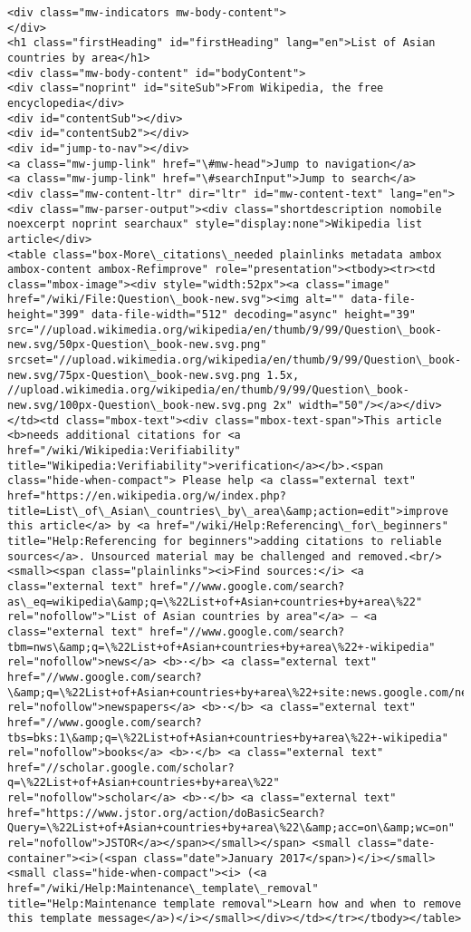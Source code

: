 \documentclass[11pt]{article}
\begin{document}
\begin{Verbatim}[commandchars=\\\{\}]
<div class="mw-indicators mw-body-content">
</div>
<h1 class="firstHeading" id="firstHeading" lang="en">List of Asian countries by area</h1>
<div class="mw-body-content" id="bodyContent">
<div class="noprint" id="siteSub">From Wikipedia, the free encyclopedia</div>
<div id="contentSub"></div>
<div id="contentSub2"></div>
<div id="jump-to-nav"></div>
<a class="mw-jump-link" href="\#mw-head">Jump to navigation</a>
<a class="mw-jump-link" href="\#searchInput">Jump to search</a>
<div class="mw-content-ltr" dir="ltr" id="mw-content-text" lang="en"><div class="mw-parser-output"><div class="shortdescription nomobile noexcerpt noprint searchaux" style="display:none">Wikipedia list article</div>
<table class="box-More\_citations\_needed plainlinks metadata ambox ambox-content ambox-Refimprove" role="presentation"><tbody><tr><td class="mbox-image"><div style="width:52px"><a class="image" href="/wiki/File:Question\_book-new.svg"><img alt="" data-file-height="399" data-file-width="512" decoding="async" height="39" src="//upload.wikimedia.org/wikipedia/en/thumb/9/99/Question\_book-new.svg/50px-Question\_book-new.svg.png" srcset="//upload.wikimedia.org/wikipedia/en/thumb/9/99/Question\_book-new.svg/75px-Question\_book-new.svg.png 1.5x, //upload.wikimedia.org/wikipedia/en/thumb/9/99/Question\_book-new.svg/100px-Question\_book-new.svg.png 2x" width="50"/></a></div></td><td class="mbox-text"><div class="mbox-text-span">This article <b>needs additional citations for <a href="/wiki/Wikipedia:Verifiability" title="Wikipedia:Verifiability">verification</a></b>.<span class="hide-when-compact"> Please help <a class="external text" href="https://en.wikipedia.org/w/index.php?title=List\_of\_Asian\_countries\_by\_area\&amp;action=edit">improve this article</a> by <a href="/wiki/Help:Referencing\_for\_beginners" title="Help:Referencing for beginners">adding citations to reliable sources</a>. Unsourced material may be challenged and removed.<br/><small><span class="plainlinks"><i>Find sources:</i> <a class="external text" href="//www.google.com/search?as\_eq=wikipedia\&amp;q=\%22List+of+Asian+countries+by+area\%22" rel="nofollow">"List of Asian countries by area"</a> – <a class="external text" href="//www.google.com/search?tbm=nws\&amp;q=\%22List+of+Asian+countries+by+area\%22+-wikipedia" rel="nofollow">news</a> <b>·</b> <a class="external text" href="//www.google.com/search?\&amp;q=\%22List+of+Asian+countries+by+area\%22+site:news.google.com/newspapers\&amp;source=newspapers" rel="nofollow">newspapers</a> <b>·</b> <a class="external text" href="//www.google.com/search?tbs=bks:1\&amp;q=\%22List+of+Asian+countries+by+area\%22+-wikipedia" rel="nofollow">books</a> <b>·</b> <a class="external text" href="//scholar.google.com/scholar?q=\%22List+of+Asian+countries+by+area\%22" rel="nofollow">scholar</a> <b>·</b> <a class="external text" href="https://www.jstor.org/action/doBasicSearch?Query=\%22List+of+Asian+countries+by+area\%22\&amp;acc=on\&amp;wc=on" rel="nofollow">JSTOR</a></span></small></span> <small class="date-container"><i>(<span class="date">January 2017</span>)</i></small><small class="hide-when-compact"><i> (<a href="/wiki/Help:Maintenance\_template\_removal" title="Help:Maintenance template removal">Learn how and when to remove this template message</a>)</i></small></div></td></tr></tbody></table>

\end{Verbatim}
\end{document}
